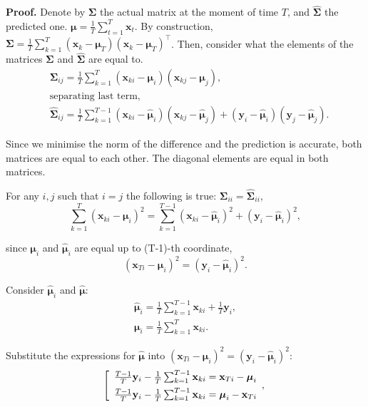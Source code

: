 \documentclass[12pt]{article}
\begin{document}
\textbf{Proof.} Denote by $\mathbf{\Sigma}$ the actual matrix at the moment of time $T$, and $\hat{\mathbf{\Sigma}}$ the predicted one. $\boldsymbol{\mu} = \frac{1}{T} \sum_{t=1}^{T} \mathbf{x}_t$. By construction, ${\mathbf{\Sigma}} = \frac{1}{T} \sum_{k=1}^{T} (\mathbf{x}_k - \boldsymbol{\mu}_T)(\mathbf{x}_k - \boldsymbol{\mu}_T)^\intercal$. Then, consider what the elements of the matrices $\mathbf{\Sigma}$ and $\hat{\mathbf{\Sigma}}$ are equal to.
\begin{align*}
	&\mathbf{\Sigma}_{ij} = \frac{1}{T}\sum_{k=1}^{T}(\mathbf{x}_{ki} - \boldsymbol{\mu}_i)(\mathbf{x}_{kj}-\boldsymbol{\mu}_j),\\
    &\text{separating last term,}\\
	&\hat{\mathbf{\Sigma}}_{ij} = \frac{1}{T}\sum_{k=1}^{T-1}(\mathbf{x}_{ki} - \hat{\boldsymbol{\mu}}_i)(\mathbf{x}_{kj}-\hat{\boldsymbol{\mu}}_j) + (\mathbf{y}_i - \hat{\boldsymbol{\mu}}_i)(\mathbf{y}_j - \hat{\boldsymbol{\mu}}_j).
\end{align*}

Since we minimise the norm of the difference and the prediction is accurate, both matrices are equal to each other. The diagonal elements are equal in both matrices.

For any $i, j$ such that $i = j$ the following is true: $\mathbf{\Sigma}_{ii} = \hat{\mathbf{\Sigma}}_{ii}$,
$$\sum_{k=1}^{T}(\mathbf{x}_{ki}-\boldsymbol{\mu}_i)^{2} = \sum_{k=1}^{T-1}(\mathbf{x}_{ki} - \hat{\boldsymbol{\mu}}_i)^{2} + (\mathbf{y}_i - \hat{\boldsymbol{\mu}}_i)^{2},$$
	
since $\boldsymbol{\mu}_i$ and $\hat{\boldsymbol{\mu}}_i$ are equal up to (T-1)-th coordinate,
$$(\mathbf{x}_{Ti}-\boldsymbol{\mu}_i)^2 = (\mathbf{y}_i-\hat{\boldsymbol{\mu}}_i)^2.$$

Consider $\hat{\boldsymbol{\mu}}_i$ and $\hat{\boldsymbol{\mu}}:$
\begin{gather*}
\hat{\boldsymbol{\mu}}_i = \frac{1}{T}\sum_{k=1}^{T-1}\mathbf{x}_{ki} + \frac{1}{T}\mathbf{y}_i,\\
\boldsymbol{\mu}_i = \frac{1}{T}\sum_{k=1}^{T}\mathbf{x}_{ki}.
\end{gather*}

Substitute the expressions for $\hat{\boldsymbol{\mu}}$ into $(\mathbf{x}_{Ti}-\boldsymbol{\mu}_i)^2 = (\mathbf{y}_i-\hat{\boldsymbol{\mu}}_i)^2:$
$$
	\left[
	\begin{array}{ll}
		\frac{T-1}{T}\mathbf{y}_i-\frac{1}{T}\sum_{k=1}^{T-1}\mathbf{x}_{ki}=\mathbf{x}_{Ti}-\boldsymbol{\mu}_i
		\\[1ex]
		\frac{T-1}{T}\mathbf{y}_i-\frac{1}{T}\sum_{k=1}^{T-1}\mathbf{x}_{ki}=\boldsymbol{\mu}_i-\mathbf{x}_{Ti}
	\end{array},
	\right .\\[1ex]
$$
\end{document}
